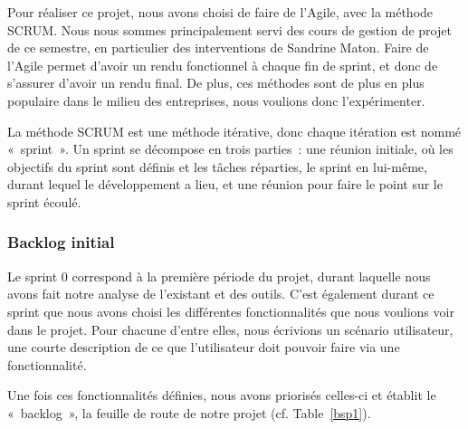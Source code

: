 Pour réaliser ce projet, nous avons choisi de faire de l'Agile, avec la méthode SCRUM. Nous nous sommes principalement servi des cours de gestion de projet de ce semestre, en particulier des interventions de Sandrine Maton. Faire de l'Agile permet d'avoir un rendu fonctionnel à chaque fin de sprint, et donc de s'assurer d'avoir un rendu final. De plus, ces méthodes sont de plus en plus populaire dans le milieu des entreprises, nous voulions donc l'expérimenter.

La méthode SCRUM est une méthode itérative, donc chaque itération est nommé «~sprint~». Un sprint se décompose en trois parties~: une réunion initiale, où les objectifs du sprint sont définis et les tâches réparties, le sprint en lui-même, durant lequel le développement a lieu, et une réunion pour faire le point sur le sprint écoulé.
\subsubsection{Backlog initial}
Le sprint 0 correspond à la première période du projet, durant laquelle nous avons fait notre analyse de l'existant et des outils. C'est également durant ce sprint que nous avons choisi les différentes fonctionnalités que nous voulions voir dans le projet. Pour chacune d'entre elles, nous écrivions un scénario utilisateur, une courte description de ce que l'utilisateur doit pouvoir faire via une fonctionnalité. 

Une fois ces fonctionnalités définies, nous avons priorisés celles-ci et établit le «~backlog~», la feuille de route de notre projet (cf. Table~\ref{bsp1}).

